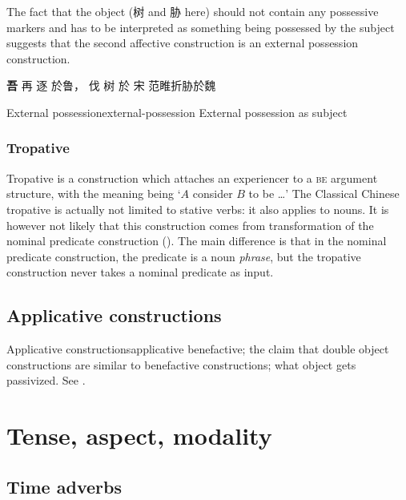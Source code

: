 \documentclass[UTF8, a4paper, oneside, scheme=plain, 12pt]{ctexrep}
\newcommand{\focus}[1]{\textbf{#1}}
\newcommand*{\citepage}[1]{p.~{#1}}
\newcommand*{\citepages}[1]{pp.~{#1}}
\newcommand{\translate}[1]{`#1'}
\newcommand*{\category}[1]{\textsc{#1}}
\begin{document}
The fact that the object (树 and 胁 here) should not contain any possessive markers
and has to be interpreted as something being possessed by the subject
suggests that the second affective construction is an external possession construction.

\begin{exe}
    \ex\label{ex:valency.affective.type-2.1} \focus{吾} 再 逐 於鲁， 伐 树 於 宋
    \ex\label{ex:valency.affective.type-2.2} 范睢折胁於魏
\end{exe}

\begin{todobox}{External possession}{external-possession}
    External possession as subject
\end{todobox}

\subsection{Tropative}

Tropative is a construction which attaches an experiencer to a \category{be} argument structure,
with the meaning being \translate{$A$ consider $B$ to be \dots}
\citep[\citepages{413-414}]{meiguang2018}
The Classical Chinese tropative is actually not limited to stative verbs:
it also applies to nouns.
It is however not likely that this construction comes from transformation of the nominal predicate construction
().
The main difference is that in the nominal predicate construction,
the predicate is a noun \emph{phrase},
but the tropative construction never takes a nominal predicate as input.

\section{Applicative constructions}

\begin{todobox}{Applicative constructions}{applicative}
    benefactive; the claim that double object constructions are similar to benefactive constructions;
    what object gets passivized.
    See \citet[\citepage{421}]{meiguang2018}.
\end{todobox}

\chapter{Tense, aspect, modality}

\section{Time adverbs}\label{sec:tam.adverbs}
\end{document}
